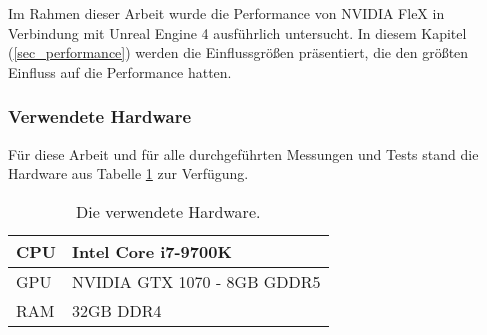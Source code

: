 
Im Rahmen dieser Arbeit wurde die Performance von NVIDIA FleX in Verbindung mit Unreal Engine 4 ausführlich untersucht. In diesem Kapitel (\ref{sec_performance}) werden die Einflussgrößen präsentiert, die den größten Einfluss auf die Performance hatten.

\subsubsection{Verwendete Hardware}

Für diese Arbeit und für alle durchgeführten Messungen und Tests stand die Hardware aus Tabelle \ref{table_hardware} zur Verfügung.


\begin{table}[hbt!]
\centering
\label{table_hardware}
\caption{Die verwendete Hardware.}
\begin{tabular}{l|l}
 \hline
CPU & Intel Core i7-9700K  \\ \hline
GPU & NVIDIA GTX 1070 - 8GB GDDR5      \\ \hline
RAM & 32GB DDR4            \\ \hline
\end{tabular}
\end{table}



